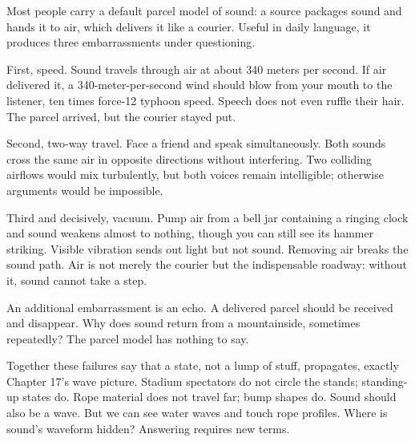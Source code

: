 
\begin{mainline}
Most people carry a default parcel model of sound: a source packages sound and hands it to air, which delivers it like a courier. Useful in daily language, it produces three embarrassments under questioning.

First, speed. Sound travels through air at about 340 meters per second. If air delivered it, a 340-meter-per-second wind should blow from your mouth to the listener, ten times force-12 typhoon speed. Speech does not even ruffle their hair. The parcel arrived, but the courier stayed put.

Second, two-way travel. Face a friend and speak simultaneously. Both sounds cross the same air in opposite directions without interfering. Two colliding airflows would mix turbulently, but both voices remain intelligible; otherwise arguments would be impossible.

Third and decisively, vacuum. Pump air from a bell jar containing a ringing clock and sound weakens almost to nothing, though you can still see its hammer striking. Visible vibration sends out light but not sound. Removing air breaks the sound path. Air is not merely the courier but the indispensable roadway: without it, sound cannot take a step.

An additional embarrassment is an echo. A delivered parcel should be received and disappear. Why does sound return from a mountainside, sometimes repeatedly? The parcel model has nothing to say.

Together these failures say that a state, not a lump of stuff, propagates, exactly Chapter 17's wave picture. Stadium spectators do not circle the stands; standing-up states do. Rope material does not travel far; bump shapes do. Sound should also be a wave. But we can see water waves and touch rope profiles. Where is sound's waveform hidden? Answering requires new terms.
\end{mainline}


